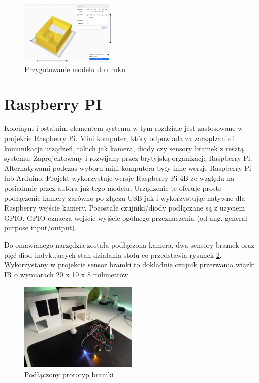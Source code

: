 \begin{figure}[h!]
  \centering
    \includegraphics[width=0.4\textwidth]{images/3D/cura_gate.png}
  \caption{Przygotowanie modelu do druku}
  \label{fig:cura-file-preparation}
\end{figure}

\label{ch:hardware:raspberrypi}
\section{Raspberry PI}
Kolejnym i ostatnim elementem systemu w tym rozdziale jest zastosowane w projekcie Raspberry Pi. Mini komputer, który odpowiada za zarządzanie i komunikacje urządzeń, takich jak kamera, diody czy sensory bramek z resztą systemu. Zaprojektowany i rozwijany przez brytyjską organizację Raspberry Pi. Alternatywami podczas wyboru mini komputera były inne wersje Raspberry Pi lub Arduino. Projekt wykorzystuje wersje Raspberry Pi 4B ze względu na posiadanie przez autora już tego modelu. Urządzenie te oferuje proste podłączenie kamery zarówno po złączu USB jak i wykorzystując natywne dla Raspberry wejście kamery. Pozostałe czujniki/diody podłączane są z użyciem GPIO. GPIO oznacza wejście-wyjście ogólnego przeznaczenia (od ang. general-purpose input/output).

Do omawianego narzędzia została podłączona kamera, dwa sensory bramek oraz pięć diod indykujących stan działania stołu co przedstawia rysunek \ref{fig:connected-gate}. Wykorzystany w projekcie sensor bramki to dokładnie czujnik przerwania wiązki IR o wymiarach 20 x 10 x 8 milimetrów.

\begin{figure}[h!]
  \centering
    \includegraphics[width=0.5\textwidth]{images/hardware/prototyp-bramki.jpg}
  \caption{Podłączony prototyp bramki}
  \label{fig:connected-gate}
\end{figure}